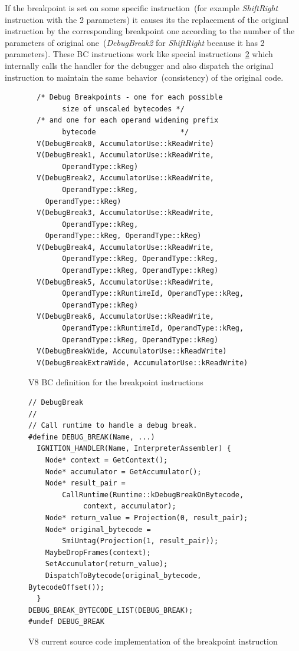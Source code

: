 \documentclass[thesis=M,english]{FITthesis}[2018/10/20]
\begin{document}
If the breakpoint is set on some specific instruction~(for example \textit{ShiftRight} instruction with the 2 parameters) it causes its the replacement of the original instruction by the corresponding breakpoint one according to the number of the parameters of original one~(\textit{DebugBreak2} for \textit{ShiftRight} because it has 2 parameters). These BC instructions work like special instructions~\ref{fig:v8-breakpoint-instruction-implementation} which internally calls the handler for the debugger and also dispatch the original instruction to maintain the same behavior~(consistency) of the original code.

\begin{figure}[H]
\begin{lstlisting}
  /* Debug Breakpoints - one for each possible
  		size of unscaled bytecodes */
  /* and one for each operand widening prefix
  		bytecode                    */
  V(DebugBreak0, AccumulatorUse::kReadWrite)
  V(DebugBreak1, AccumulatorUse::kReadWrite,
  		OperandType::kReg)
  V(DebugBreak2, AccumulatorUse::kReadWrite,
  		OperandType::kReg,
    OperandType::kReg)
  V(DebugBreak3, AccumulatorUse::kReadWrite,
  		OperandType::kReg,
    OperandType::kReg, OperandType::kReg)
  V(DebugBreak4, AccumulatorUse::kReadWrite,
  		OperandType::kReg, OperandType::kReg,
  		OperandType::kReg, OperandType::kReg)
  V(DebugBreak5, AccumulatorUse::kReadWrite,
  		OperandType::kRuntimeId, OperandType::kReg,
  		OperandType::kReg)
  V(DebugBreak6, AccumulatorUse::kReadWrite,
  		OperandType::kRuntimeId, OperandType::kReg,
  		OperandType::kReg, OperandType::kReg)
  V(DebugBreakWide, AccumulatorUse::kReadWrite)
  V(DebugBreakExtraWide, AccumulatorUse::kReadWrite)
\end{lstlisting}
	\caption{V8 BC definition for the breakpoint instructions}\label{fig:v8-bc-breakpoint-definitions}
\end{figure}

\begin{figure}[H]
\begin{lstlisting}
// DebugBreak
//
// Call runtime to handle a debug break.
#define DEBUG_BREAK(Name, ...)
  IGNITION_HANDLER(Name, InterpreterAssembler) {
    Node* context = GetContext();
    Node* accumulator = GetAccumulator();
    Node* result_pair =
        CallRuntime(Runtime::kDebugBreakOnBytecode,
        	 context, accumulator);
    Node* return_value = Projection(0, result_pair);
    Node* original_bytecode =
    	SmiUntag(Projection(1, result_pair));
    MaybeDropFrames(context);
    SetAccumulator(return_value);
    DispatchToBytecode(original_bytecode, BytecodeOffset());
  }
DEBUG_BREAK_BYTECODE_LIST(DEBUG_BREAK);
#undef DEBUG_BREAK
\end{lstlisting}
	\caption{V8 current source code implementation of the breakpoint instruction}\label{fig:v8-breakpoint-instruction-implementation}
\end{figure}
\end{document}
